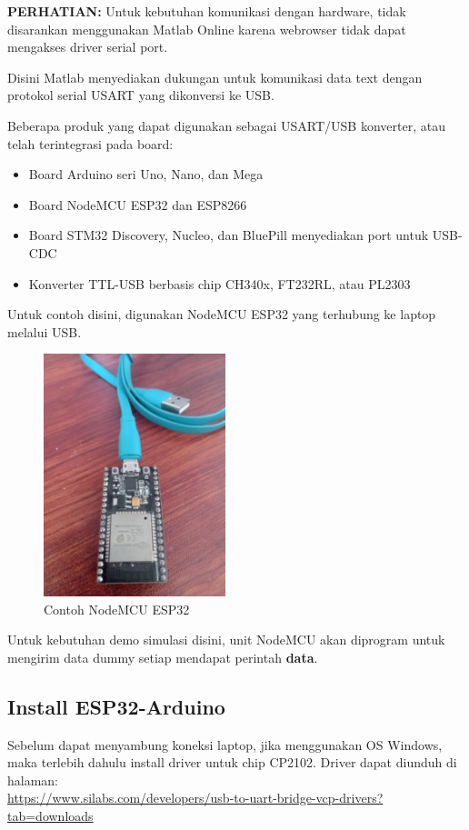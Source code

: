\documentclass[12pt]{book}
\begin{document}
	\textbf{PERHATIAN:} Untuk kebutuhan komunikasi dengan hardware, tidak disarankan menggunakan Matlab Online
	karena webrowser tidak dapat mengakses driver serial port.

	Disini Matlab menyediakan dukungan untuk komunikasi data text dengan protokol serial USART yang dikonversi ke USB.

	Beberapa produk yang dapat digunakan sebagai USART/USB konverter, atau telah terintegrasi pada board:
	\begin{itemize}
		\item Board Arduino seri Uno, Nano, dan Mega
		\item Board NodeMCU ESP32 dan ESP8266
		\item Board STM32 Discovery, Nucleo, dan BluePill menyediakan port untuk USB-CDC
		\item Konverter TTL-USB berbasis chip CH340x, FT232RL, atau PL2303
	\end{itemize}

	Untuk contoh disini, digunakan NodeMCU ESP32 yang terhubung ke laptop melalui USB.

	\begin{figure}[!ht]
		\centering
		\includegraphics[width=150pt]{images/esp32nodemcu}
		\caption{Contoh NodeMCU ESP32}
	\end{figure}

	Untuk kebutuhan demo simulasi disini, unit NodeMCU akan diprogram untuk mengirim data dummy setiap mendapat perintah \textbf{data}.

	\newpage
	\subsection{Install ESP32-Arduino}
	Sebelum dapat menyambung koneksi laptop, jika menggunakan OS Windows, maka terlebih dahulu install driver untuk chip CP2102.
	Driver dapat diunduh di halaman:\\
	\url{https://www.silabs.com/developers/usb-to-uart-bridge-vcp-drivers?tab=downloads}\\
\end{document}
